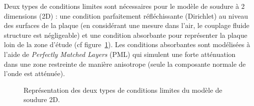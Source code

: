Deux types de conditions limites sont nécessaires pour le modèle de soudure à 2 dimensions (2D) : une condition parfaitement réfléchissante (Dirichlet) au niveau des surfaces de la plaque (en considérant une mesure dans l'air, le couplage fluide structure est négligeable) et une condition absorbante pour représenter la plaque loin de la zone d'étude (cf figure~\ref{BC}). Les conditions absorbantes sont modélisées à l'aide de \emph{Perfectly Matched Layers} (PML) qui simulent une forte atténuation dans une zone restreinte de manière anisotrope (seule la composante normale de l'onde est atténuée).\\

\begin{figure}[!h]
	\centering
	\caption{Représentation des deux types de conditions limites du modèle de soudure 2D.\label{BC}}
\end{figure}


